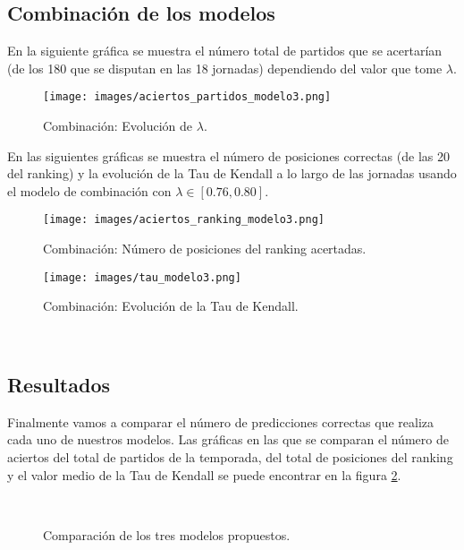 \newpage

\subsection{Combinación de los modelos}
En la siguiente gráfica se muestra el número total de partidos que se acertarían (de los 180 que se disputan en las 18 jornadas) dependiendo del valor que tome $\lambda$.
\begin{figure}[H]
	\centering
	\texttt{[image: images/aciertos\_partidos\_modelo3.png]}
	\caption{Combinación: Evolución de $\lambda$.} \label{fig:evol_lambda}
\end{figure}

En las siguientes gráficas se muestra el número de posiciones correctas (de las 20 del ranking) y la evolución de la Tau de Kendall a lo largo de las jornadas usando el modelo de combinación con $\lambda \in [0.76,0.80]$.
\begin{figure}[H]
	\centering
	\texttt{[image: images/aciertos\_ranking\_modelo3.png]}
	\caption{Combinación: Número de posiciones del ranking acertadas.}
\end{figure}
 
\begin{figure}[H]
	\centering
	\texttt{[image: images/tau\_modelo3.png]}
	\caption{Combinación: Evolución de la Tau de Kendall.}
\end{figure}

\ \\

\newpage

\subsection{Resultados}
Finalmente vamos a comparar el número de predicciones correctas que realiza cada uno de nuestros modelos. Las gráficas en las que se comparan el número de aciertos del total de partidos de la temporada, del total de posiciones del ranking y el valor medio de la Tau de Kendall se puede encontrar en la figura \ref{fig:comparacion_modelos}.\\

\begin{figure}[H]
	\centering
	\\
	\caption{Comparación de los tres modelos propuestos.} \label{fig:comparacion_modelos}
\end{figure} 

